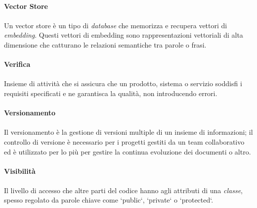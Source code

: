 \documentclass[10pt, a4paper]{article}
\begin{document}
\vspace{2em}
\paragraph{Vector Store}\noindent\hrulefill
\paragraph{}Un vector store è un tipo di \textit{database\pg} che memorizza e recupera vettori di \textit{embedding\pg}. Questi vettori di embedding sono rappresentazioni vettoriali di alta dimensione che catturano le relazioni semantiche tra parole o frasi.

\vspace{2em}
\paragraph{Verifica}\noindent\hrulefill
\paragraph{}Insieme di attività che si assicura che un prodotto, sistema o servizio soddisfi i requisiti specificati e ne garantisca la qualità, non introducendo errori.


\vspace{2em}
\paragraph{Versionamento}\noindent\hrulefill
\paragraph{}Il versionamento è la gestione di versioni multiple di un insieme di informazioni; il controllo di versione è necessario
per i progetti gestiti da un team collaborativo ed è utilizzato per lo più per gestire la continua evoluzione dei documenti o altro.

\vspace{2em}
\paragraph{Visibilità}\noindent\hrulefill
\paragraph{}Il livello di accesso che altre parti del codice hanno agli attributi di una \textit{classe\pg}, spesso regolato da parole chiave come `public`, `private` o `protected`.
\end{document}
